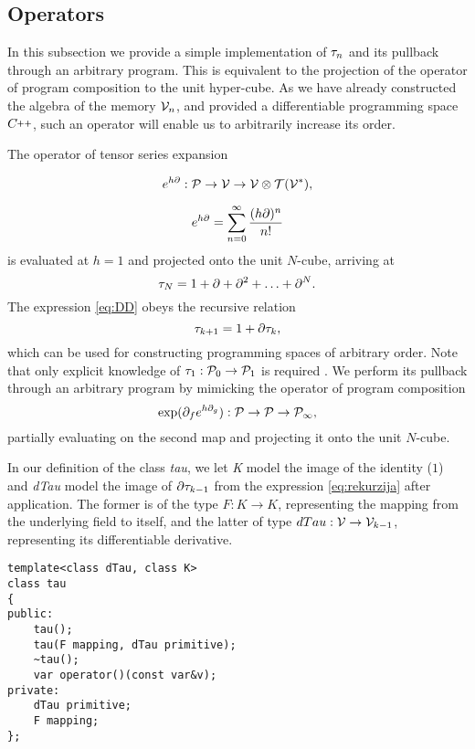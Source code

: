              
\subsection{Operators}\label{sec:operators}

In this subsection we provide a simple implementation of $\tau_n$ and its pullback through an arbitrary program. This is equivalent to the projection of the operator of program composition to the unit hyper-cube. As we have already constructed the algebra of the memory $\mathcal{V}_n$, and provided a differentiable programming space $\CC$, such an operator will enable us to arbitrarily increase its order.

The operator of tensor series expansion \cite[Theorem~5.1]{OperationalCalculus}

\begin{equation}\label{eq:specProg}
            e^{h\partial}:\mathcal{P}\to\mathcal{V}\to \mathcal{V}\otimes \mathcal{T}(\mathcal{V}^*),
          \end{equation}

\begin{equation}
  e^{h\partial}=\sum\limits_{n=0}^{\infty}\frac{(h\partial)^n}{n!}
 \end{equation}
 is evaluated at $h=1$ and projected onto the unit $N$-cube, arriving at 
\begin{equation}\label{eq:DD}
    \tau_N = 1+\partial +\partial^2 +\ldots + \partial^N.
  \end{equation}
The expression \eqref{eq:DD} obeys the recursive relation
\begin{equation}
      \label{eq:rekurzija}
      \tau_{k+1} = 1+\partial\tau_k,
    \end{equation}
which can be used for constructing programming spaces of arbitrary order. Note that only explicit knowledge of $\tau_1:\mathcal{P}_0\to\mathcal{P}_1$ is required \cite[Proposition~5.1]{OperationalCalculus}. We perform its pullback through an arbitrary program by mimicking the operator of program composition \cite[Theorem~5.2]{OperationalCalculus}
\begin{equation}\label{eq:opKompo}
  \exp(\partial_fe^{h\partial_g}): \mathcal{P}\to\mathcal{P}\to\mathcal{P}_\infty,
  \end{equation}
partially evaluating on the second map and projecting it onto the unit $N$-cube.         

In our definition of the class \emph{tau}, we let \emph{K} model the image of the identity ($1$) and \emph{dTau} model the image of $\partial\tau_{k-1}$ from the expression \eqref{eq:rekurzija} after application. The former is of the type $F:K\to K$, representing the mapping from the underlying field to itself, and the latter of type $dTau:\mathcal{V}\to\mathcal{V}_{k-1}$, representing its differentiable derivative.  
\begin{lstlisting}
template<class dTau, class K>
class tau
{
public:
    tau();
    tau(F mapping, dTau primitive);
    ~tau();
    var operator()(const var&v);
private:
    dTau primitive;
    F mapping;
};
\end{lstlisting}        
        
